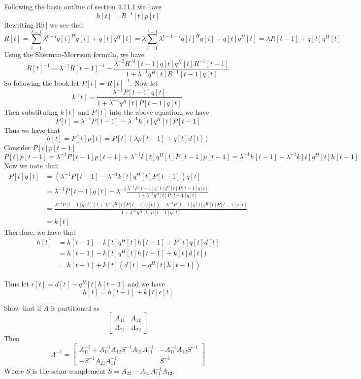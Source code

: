 \documentclass{homework}
\begin{document}
\begin{solution}
  Following the basic outline of section 4.11.1 we have
  \[ h[t] = R^{-1}[t]p[t] \]
  Rewriting R[t] we see that
  \[ R[t] = \sum^{t-1}_{i=1} \lambda^{t-i}q[i]^Hq[i] + q[t]q^H[t] = \lambda\sum^{t-1}_{i=1} \lambda^{t - 1 - i}q[i]^Hq[i] + q[t]q^H[t] = \lambda R[t-1] + q[t]q^H[t]\]
  Using the Sherman-Morrison formula, we have
  \[ 
    R[t]^{-1} = \lambda^{-1}R[t-1]^{-1} - \frac{\lambda^{-2}R^{-1}[t-1]q[t]q^H[t]R^{-1}[t-1]}{1 + \lambda^{-1}q^{H}[t]R^{-1}[t-1]q[t]} 
  \]
  So following the book let $P[t] = R[t]^{-1}$. Now let
  \[
    k[t] = \frac{\lambda^{-1}P[t-1]q[t]}{1 + \lambda^{-1}q^{H}[t]P[t-1]q[t]}.
  \]
  Then substituting $k[t]$ and $P[t]$ into the above equation, we have
  \[
    P[t] = \lambda^{-1}P[t-1] - \lambda^{-1}k[t]q^{H}[t]P[t-1]
  \]
  Thus we have that
  \[ 
    h[t] = P[t]p[t] = P[t](\lambda p[t-1] + q[t]d[t])
  \]
  Consider $P[t]p[t-1]$
  \[ P[t]p[t-1] = \lambda^{-1}P[t-1]p[t-1] + \lambda^{-1}k[t]q^H[t]P[t-1]p[t-1] = \lambda^{-1}h[t-1] - \lambda^{-1}k[t]q^H[t]h[t-1]\]
  Now we note that 
  \[ 
    \begin{aligned}
      P[t]q[t] &= (\lambda^{-1}P[t-1] - \lambda^{-1}k[t]q^{H}[t]P[t-1])q[t] \\
               &= \lambda^{-1}P[t-1]q[t] - \lambda^{-1}\frac{\lambda^{-1}P[t-1]q[t]q^H[t]P[t-1]q[t]}{1 + \lambda^{-1}q^{H}[t]P[t-1]q[t]}\\
               &= \frac{\lambda^{-1}P[t-1]q[t](1 + \lambda^{-1}q^H[t]P[t-1]q[t]) -\lambda^{-2}P[t-1]q[t]q^H[t]P[t-1]q[t]}{1 + \lambda^{-1}q^H[t]P[t-1]q[t]} \\
               &= k[t]
    \end{aligned} \]
  Therefore, we have that
  \[ 
    \begin{aligned}
      h[t] &= h[t-1] - k[t]q^H[t]h[t-1] + P[t]q[t]d[t] \\
           &= h[t-1] - k[t]q^H[t]h[t-1] + k[t]d[t]) \\
           &= h[t-1] + k[t](d[t] - q^H[t]h[t-1])
    \end{aligned}
  \]

  Thus let $\epsilon[t] = d[t] - q^H[t]h[t-1]$ and we have
  \[ h[t] = h[t-1] + k[t]\epsilon[t] \]
\end{solution}

\begin{problem}[4-56]
 Show that if $A$ is partitioned as 
 \[
 \begin{bmatrix}
   A_{11} & A_{12} \\
   A_{21} & A_{22}
 \end{bmatrix}
 \]
 Then 
 \[A^{-1} = 
   \begin{bmatrix}
     A_{11}^{-1} + A_{11}^{-1}A_{12}S^{-1}A_{21}A_{11}^{-1} & -A_{11}^{-1}A_{12}S^{-1} \\
     -S^{-1}A_{21}A_{11}^{-1} & S^{-1}
   \end{bmatrix}
 \]
 Where $S$ is the schur complement $S = A_{22} - A_{21}A_{11}^{-1}A_{12}$.
\end{problem}
\end{document}
